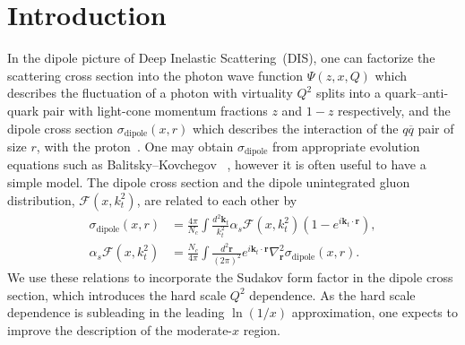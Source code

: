 \documentclass{appolb}
\begin{document}
\section{Introduction}
In the dipole picture of Deep Inelastic Scattering~(DIS), one can factorize the scattering cross section into the photon wave function $\Psi(z,x,Q)$ which describes the fluctuation of a photon with virtuality $Q^2$ splits into a quark--anti-quark pair with light-cone momentum fractions $z$ and $1-z$ respectively, and the dipole cross section $\sigma_\mathrm{dipole}(x,r)$ which describes the interaction of the $q\overline{q}$ pair of size $r$, with the proton~\cite{Golec-Biernat:1998zce, Kovchegov:2012mbw}. One may obtain $\sigma_\mathrm{dipole}$ from appropriate evolution equations such as Balitsky--Kovchegov~\cite{Balitsky:1995ub,Kovchegov:1999yj}
, however it is often useful to have a simple model.
The dipole cross section and the dipole unintegrated gluon distribution, $\mathcal{F}(x,k_t^2)$, are related to each other by~\cite{Golec-Biernat:1999qor,Bartels:2002cj}
\begin{align} 
    \sigma_{\mathrm{dipole}}(x,r) &= \frac{4 \pi}{N_c} \int\frac{d^2 \mathbf{k}_t }{k_t^2} \alpha_s \mathcal{F}(x, k_t^2) (1-e^{i {\mathbf{k}_t\cdot \mathbf{r}}}),
    \label{eq:ugdtosigma}\\
    \alpha_s \mathcal{F}(x,k_t^2) &= \frac{N_c }{4 \pi}\int \frac{d^2  \mathbf{r}}{(2\pi)^2} e^{i {\mathbf{k}_t\cdot \mathbf{r}}}  \nabla^2_{\mathbf{r}} \sigma_{\mathrm{dipole}}(x,r).
    \label{eq:sigmatougd}
\end{align}
We use these relations to incorporate the Sudakov form factor in the dipole cross section, which introduces the hard scale $Q^2$ dependence. As the hard scale dependence is subleading in the leading $\ln(1/x)$ approximation\cite{Kimber:1999xc, Kimber:2000bg}, one expects to improve the description of the moderate-$x$ region. 
\end{document}
